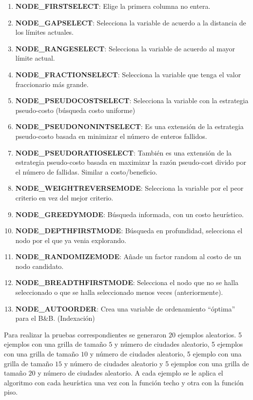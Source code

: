 \documentclass[10pt]{article}
\begin{document}
\begin{enumerate}
 \item \textbf{NODE\_FIRSTSELECT}: Elige la primera columna no entera.%
 \item \textbf{NODE\_GAPSELECT}: Selecciona la variable de acuerdo a la distancia de los límites actuales.%
 \item \textbf{NODE\_RANGESELECT}: Selecciona la variable de acuerdo al mayor límite actual.%
 \item \textbf{NODE\_FRACTIONSELECT}: Selecciona la variable que tenga el valor fraccionario más grande.%
 \item \textbf{NODE\_PSEUDOCOSTSELECT}: Selecciona la variable con la estrategia pseudo-costo (búsqueda costo uniforme)%
 \item \textbf{NODE\_PSEUDONONINTSELECT}: Es una extensión de la estrategia pseudo-costo basada en minimizar el número de enteros fallidos.%
 \item \textbf{NODE\_PSEUDORATIOSELECT}: También es una extensión de la estrategia pseudo-costo basada en maximizar la razón pseudo-cost divido por el número de fallidas. Similar a costo/beneficio.%
 \item \textbf{NODE\_WEIGHTREVERSEMODE}: Selecciona la variable por el peor criterio en vez del mejor criterio.%
 \item \textbf{NODE\_GREEDYMODE}: Búsqueda informada, con un costo heurístico.%
 \item \textbf{NODE\_DEPTHFIRSTMODE}: Búsqueda en profundidad, selecciona el nodo por el que ya venia explorando.%
 \item \textbf{NODE\_RANDOMIZEMODE}: Añade un factor random al costo de un nodo candidato.%
 \item \textbf{NODE\_BREADTHFIRSTMODE}: Selecciona el nodo que no se halla seleccionado o que se halla seleccionado menos veces (anteriormente).%
 \item \textbf{NODE\_AUTOORDER}: Crea una variable de ordenamiento ``óptima'' para el B\&B. (Indexación)%
\end{enumerate}


Para realizar la pruebas correspondientes se generaron $20$ ejemplos aleatorios. 5 ejemplos con una grilla de tamaño $5$ y número de ciudades aleatorio, 5 ejemplos con una grilla
de tamaño $10$ y número de ciudades aleatorio, 5 ejemplo con una grilla de tamaño $15$ y número de ciudades aleatorio y 5 ejemplos con una grilla de tamaño $20$ y número de ciudades aleatorio.
A cada ejemplo se le aplica el algoritmo con cada heurística una vez con la función techo y otra con la función piso.\\
\end{document}
